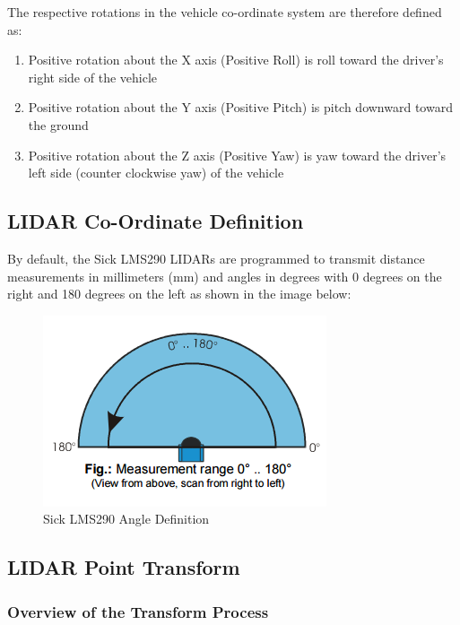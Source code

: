 \newpage

\noindent The respective rotations in the vehicle co-ordinate system are therefore defined as:

\begin{enumerate}
\item Positive rotation about the X axis (Positive Roll) is roll toward the driver's right side of the vehicle
\item Positive rotation about the Y axis (Positive Pitch) is pitch downward toward the ground
\item Positive rotation about the Z axis (Positive Yaw) is yaw toward the driver's left side (counter clockwise yaw) of the vehicle
\end{enumerate}

\subsection{LIDAR Co-Ordinate Definition}
By default, the Sick LMS290 LIDARs are programmed to transmit distance measurements in millimeters (mm) and angles in degrees with 0 degrees on the right and 180 degrees on the left as shown in the image below:

\begin{figure}[h!]
\centering
\includegraphics[scale=.9]{Photos/LIDAR_AngleDef.png}
\caption[Sick LMS290 Angle Definition]{Sick LMS290 Angle Definition \protect \footnotemark}
\label{fig:sick_angledef}
\end{figure} 

\newpage

\subsection{LIDAR Point Transform}

\subsubsection{Overview of the Transform Process}

